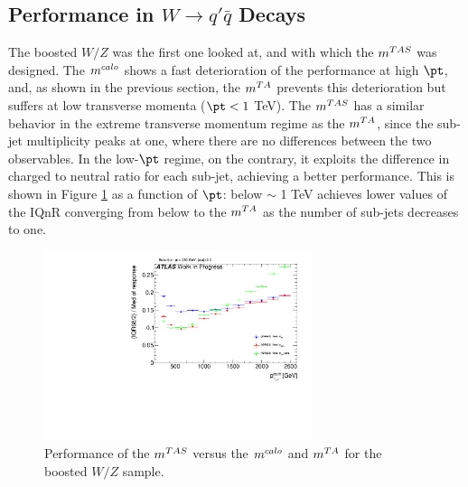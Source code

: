 
\subsection{Performance in $W \to q'\bar{q}$ Decays}
The boosted $W/Z$ was the first one looked at, and with which the $\mtas$ was designed. The $m^{calo}$ shows a fast deterioration of the performance at high $\pt$, and, as shown in the previous section, the $m^{TA}$ prevents this deterioration but suffers at low transverse momenta ($\pt<1$ TeV).
The $\mtas$ has a similar behavior in the extreme transverse momentum regime as the $m^{TA}$, since the sub-jet multiplicity peaks at one, where there are no differences between the two observables.
In the low-$\pt$ regime, on the contrary, it exploits the difference in charged to neutral ratio for each sub-jet, achieving a better performance.
This is shown in Figure \ref{fig:mtas2} as a function of $\pt$: below $\sim$ 1 TeV achieves lower values of the IQnR converging from below to the $m^{TA}$ as the number of sub-jets decreases to one.

\begin{figure}[!ht]
  \centering
      \includegraphics[width=0.7\textwidth]{jet_part/mtas/71graphcftr_h_JetRatio_mJ12CALOIQRoMWZ.pdf}
  \caption[$\mtas$ for boosted $W/Z$]{Performance of the $\mtas$ versus the $m^{calo}$ and $m^{TA}$ for the boosted $W/Z$ sample.}
  \label{fig:mtas2}
\end{figure}

